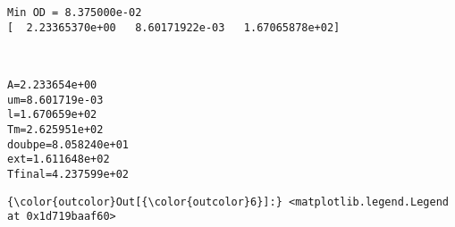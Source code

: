 \documentclass[11pt]{article}
\begin{document}
    \begin{Verbatim}[commandchars=\\\{\}]
Min OD = 8.375000e-02
[  2.23365370e+00   8.60171922e-03   1.67065878e+02]

    \end{Verbatim}

    \begin{center}
    \end{center}
    { \hspace*{\fill} \\}
    
    \begin{Verbatim}[commandchars=\\\{\}]
A=2.233654e+00
um=8.601719e-03
l=1.670659e+02
Tm=2.625951e+02
doubpe=8.058240e+01
ext=1.611648e+02
Tfinal=4.237599e+02

    \end{Verbatim}

            \begin{Verbatim}[commandchars=\\\{\}]
{\color{outcolor}Out[{\color{outcolor}6}]:} <matplotlib.legend.Legend at 0x1d719baaf60>
\end{Verbatim}
        
    \begin{center}
    \end{center}
    { \hspace*{\fill} \\}
    
    \begin{center}
    \end{center}
    { \hspace*{\fill} \\}
    
\end{document}
